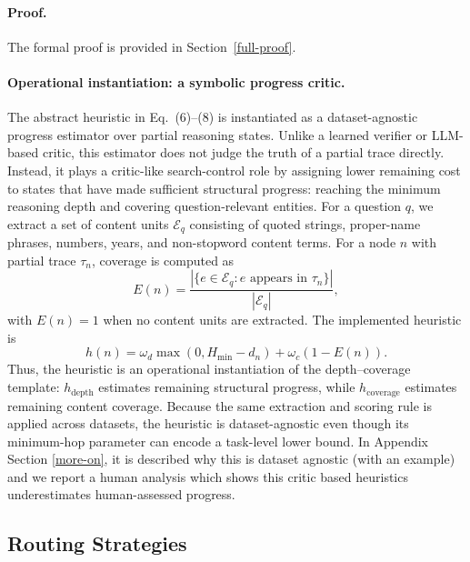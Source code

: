 \documentclass[11pt]{article}
\begin{document}
\paragraph{Proof.}
The formal proof is provided in Section~\ref{full-proof}.




\paragraph{Operational instantiation: a symbolic progress critic.}
The abstract heuristic in Eq.~(6)--(8) is instantiated as a
dataset-agnostic progress estimator over partial reasoning states. Unlike
a learned verifier or LLM-based critic, this estimator does not judge the
truth of a partial trace directly. Instead, it plays a critic-like
search-control role by assigning lower remaining cost to states that have
made sufficient structural progress: reaching the minimum reasoning depth
and covering question-relevant entities. For a question \(q\), we extract
a set of content units \(\mathcal{E}_q\) consisting of quoted strings,
proper-name phrases, numbers, years, and non-stopword content terms. For
a node \(n\) with partial trace \(\tau_n\), coverage is computed as
\[
E(n)=
\frac{|\{e\in\mathcal{E}_q: e \text{ appears in } \tau_n\}|}
{|\mathcal{E}_q|},
\]
with \(E(n)=1\) when no content units are extracted. The implemented
heuristic is
\[
h(n)
=
\omega_d\max(0,H_{\min}-d_n)
+
\omega_c(1-E(n)).
\]
Thus, the heuristic is an operational instantiation of the
depth--coverage template: \(h_{\mathrm{depth}}\) estimates remaining
structural progress, while \(h_{\mathrm{coverage}}\) estimates remaining
content coverage. Because the same extraction and scoring rule is applied
across datasets, the heuristic is dataset-agnostic even though its
minimum-hop parameter can encode a task-level lower bound. In Appendix Section \ref{more-on}, it is described why this is dataset agnostic (with an example) and we report a human analysis which shows this critic based heuristics underestimates human-assessed progress.





\subsection{Routing Strategies}
\label{sec:routing}
\end{document}
